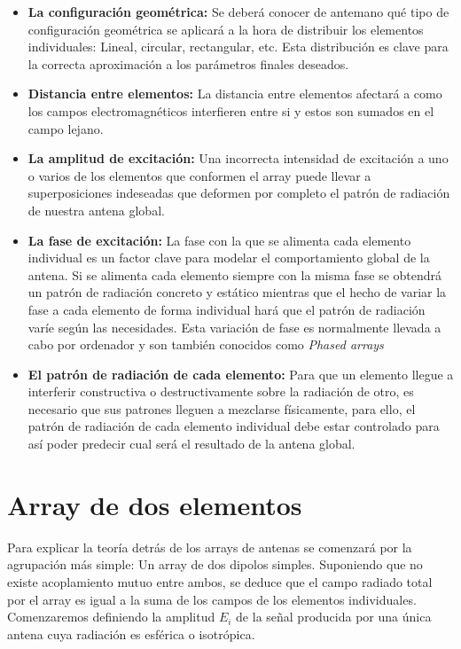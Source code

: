 \begin{itemize}
\item \textbf{La configuración geométrica: }Se deberá conocer de antemano qué tipo de configuración geométrica se aplicará a la hora de distribuir los elementos individuales: Lineal, circular, rectangular, etc. Esta distribución es clave para la correcta aproximación a los parámetros finales deseados.

\item \textbf{Distancia entre elementos: }La distancia entre elementos  afectará a como los campos electromagnéticos interfieren entre si y estos son sumados en el campo lejano.

\item \textbf{La amplitud de excitación: }Una incorrecta intensidad de excitación a uno o varios de los elementos que conformen el array puede llevar a superposiciones indeseadas que deformen por completo el patrón de radiación de nuestra antena global.

\item \textbf{La fase de excitación: }La fase con la que se alimenta cada elemento individual es un factor clave para modelar el comportamiento global de la antena. Si se alimenta cada elemento siempre con la misma fase se obtendrá un patrón de radiación concreto y estático mientras que el hecho de variar la fase a cada elemento de forma individual hará que el patrón de radiación varíe según las necesidades. Esta variación de fase es normalmente llevada a cabo por ordenador y son también conocidos como \textit{Phased arrays}

\item \textbf{El patrón de radiación de cada elemento: }Para que un elemento llegue a interferir constructiva o destructivamente sobre la radiación de otro, es necesario que sus patrones lleguen a mezclarse físicamente, para ello, el patrón de radiación de cada elemento individual debe estar controlado para así poder predecir cual será el resultado de la antena global.
\end{itemize}

\section{Array de dos elementos}

\par Para explicar la teoría detrás de los arrays de antenas se comenzará por la agrupación más simple: Un array de dos dipolos simples. Suponiendo que no existe acoplamiento mutuo entre ambos, se deduce que el campo radiado total por el array es igual a la suma de los campos de los elementos individuales. Comenzaremos definiendo la amplitud \textit{$E_{i}$} de la señal producida por una única antena cuya radiación es esférica o isotrópica. 

